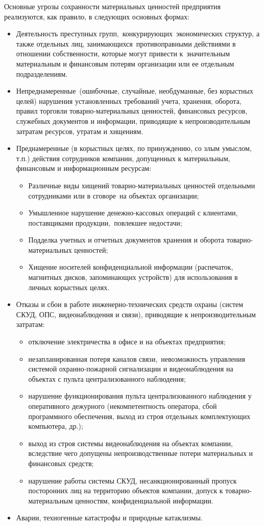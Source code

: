 \documentclass[a4paper,12pt,fleqn]{article} %
\begin{document}
Основные угрозы сохранности материальных ценностей предприятия реализуются, как правило, в следующих основных формах:
\begin{itemize}
	\item Деятельность преступных групп, конкурирующих экономических структур, а также отдельных лиц, занимающихся противоправными действиями в отношении собственности, которые могут привести к значительным материальным и финансовым потерям организации или ее отдельным подразделениям.
	\item Непреднамеренные (ошибочные, случайные, необдуманные, без корыстных целей) нарушения установленных требований учета, хранения, оборота, правил торговли товарно-материальных ценностей, финансовых ресурсов, служебных документов и информации, приводящие к непроизводительным затратам ресурсов, утратам и хищениям.
	\item Преднамеренные (в корыстных целях, по принуждению, со злым умыслом, т.п.) действия сотрудников компании, допущенных к материальным, финансовым и информационным ресурсам:
	\begin{itemize}
		\item Различные виды хищений товарно-материальных ценностей отдельными сотрудниками или в сговоре на объектах организации;
		\item Умышленное нарушение денежно-кассовых операций с клиентами, поставщиками продукции, повлекшее недостачи;   
		\item Подделка учетных и отчетных документов хранения и оборота товарно-материальных ценностей;
		\item Хищение носителей конфиденциальной информации (распечаток, магнитных дисков, запоминающих устройств) для использования в личных корыстных целях.
	\end{itemize}
	\item Отказы и сбои в работе инженерно-технических средств охраны (систем СКУД, ОПС, видеонаблюдения и связи), приводящие к непроизводительным затратам:
	\begin{itemize}
		\item отключение электричества в офисе и на объектах предприятия;
		\item незапланированная потеря каналов связи, невозможность управления системой охранно-пожарной сигнализации и видеонаблюдения на объектах с пульта централизованного наблюдения;
		\item нарушение функционирования пульта централизованного наблюдения у оперативного дежурного (некомпетентность оператора, сбой программного обеспечения, выход из строя отдельных комплектующих компьютера, др.);
		\item выход из строя системы видеонаблюдения на объектах компании, вследствие чего допущены непроизводственные потери материальных и финансовых средств;
		\item нарушение работы системы СКУД, несанкционированный пропуск посторонних лиц на территорию объектов компании, допуск к товарно-материальным ценностям, конфиденциальной информации.
	\end{itemize}
	\item Аварии, техногенные катастрофы и природные катаклизмы.
\end{itemize}
\end{document}
